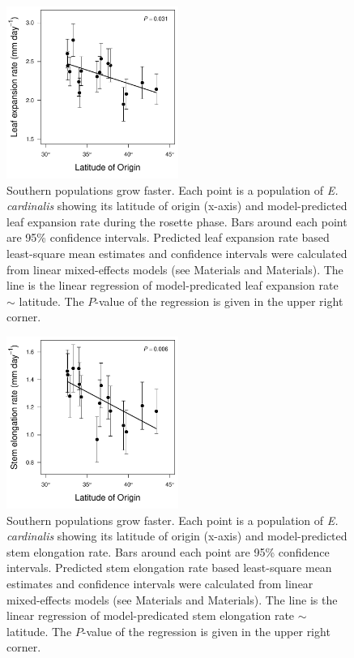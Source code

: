 \documentclass[11pt, oneside]{article}
\begin{document}
\begin{figure}[h!]
	\centerline{\includegraphics[width=0.5\textwidth]{Figures/FigureS_LERlat.pdf}}
	\fontsize{10}{12}
	\selectfont
	\caption[Southern populations grow faster (leaf expansion rate).]{Southern populations grow faster. Each point is a population of \textit{E. cardinalis} showing its latitude of origin (x-axis) and model-predicted leaf expansion rate during the rosette phase. Bars around each point are 95\% confidence intervals. Predicted leaf expansion rate based least-square mean estimates and confidence intervals were calculated from linear mixed-effects models (see Materials and Materials). The line is the linear regression of model-predicated leaf expansion rate $\sim$ latitude. The $P$-value of the regression is given in the upper right corner.}
	\label{fig:FigS_LERlat}
\end{figure}


\begin{figure}[h!]
	\centerline{\includegraphics[width=0.5\textwidth]{Figures/FigureS_SERlat.pdf}}
	\fontsize{10}{12}
	\selectfont
	\caption[Southern populations grow faster (stem elongation rate).]{Southern populations grow faster. Each point is a population of \textit{E. cardinalis} showing its latitude of origin (x-axis) and model-predicted stem elongation rate. Bars around each point are 95\% confidence intervals. Predicted stem elongation rate based least-square mean estimates and confidence intervals were calculated from linear mixed-effects models (see Materials and Materials). The line is the linear regression of model-predicated stem elongation rate $\sim$ latitude. The $P$-value of the regression is given in the upper right corner.}
	\label{fig:FigS_SERlat}
\end{figure}
\end{document}

